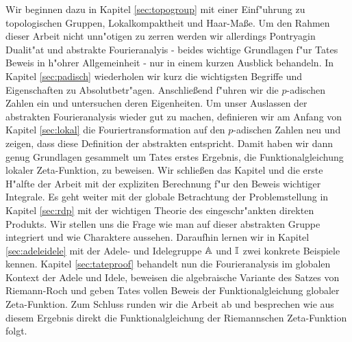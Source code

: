 	Wir beginnen dazu in Kapitel \ref{sec:topogroup} mit einer Einf"uhrung zu topologischen Gruppen, Lokalkompaktheit und Haar-Maße.
	Um den Rahmen dieser Arbeit nicht unn"otigen zu zerren werden wir allerdings Pontryagin Dualit"at und abstrakte Fourieranalyis - beides wichtige Grundlagen f"ur Tates Beweis in h"ohrer Allgemeinheit - nur in einem kurzen Ausblick behandeln.
	In Kapitel \ref{sec:padisch} wiederholen wir kurz die wichtigsten Begriffe und Eigenschaften zu Absolutbetr"agen. 
	Anschließend f"uhren wir die $p$-adischen Zahlen ein und untersuchen deren Eigenheiten.
	Um unser Auslassen der abstrakten Fourieranalysis wieder gut zu machen, definieren wir am Anfang von Kapitel \ref{sec:lokal} die Fouriertransformation auf den $p$-adischen Zahlen neu und zeigen, dass diese Definition der abstrakten entspricht. 
	Damit haben wir dann genug Grundlagen gesammelt um Tates erstes Ergebnis, die Funktionalgleichung lokaler Zeta-Funktion, zu beweisen.
	Wir schließen das Kapitel und die erste H"alfte der Arbeit mit der expliziten Berechnung f"ur den Beweis wichtiger Integrale.
	Es geht weiter mit der globale Betrachtung der Problemstellung in Kapitel \ref{sec:rdp} mit der wichtigen Theorie des eingeschr"ankten direkten Produkts.
	Wir stellen uns die Frage wie man auf dieser abstrakten Gruppe integriert und wie Charaktere aussehen.
	Daraufhin lernen wir in Kapitel \ref{sec:adeleidele} mit der Adele- und Idelegruppe $\mathbb{A}$ und $\mathbb{I}$ zwei konkrete Beispiele kennen.
	Kapitel \ref{sec:tateproof} behandelt nun die Fourieranalysis im globalen Kontext der Adele und Idele, beweisen die algebraische Variante des Satzes von Riemann-Roch und geben Tates vollen Beweis der Funktionalgleichung globaler Zeta-Funktion. 
	Zum Schluss runden wir die Arbeit ab und besprechen wie aus diesem Ergebnis direkt die Funktionalgleichung der Riemannschen Zeta-Funktion folgt.
	
	
	
	
	



